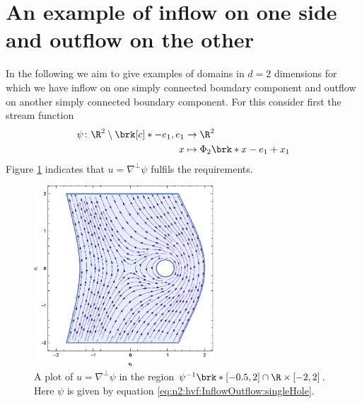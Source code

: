 \section{An example of inflow on one side and outflow on the other}
In the following we aim to give examples of domains in $d=2$ dimensions for which 
we have inflow on one simply connected boundary component and outflow on another simply connected boundary
component.
For this consider first the stream function
\begin{equation}
  \begin{aligned}
  \psi\colon \R^2\setminus\brk[c]*{-e_1,e_1}&\to\R^2 \\
  x&\mapsto\Phi_2\brk*{x-e_1}+x_1
  \end{aligned}\label{eq:n2:hvf:InflowOutflow:singleHole}
\end{equation}
Figure \ref{pl:n2_hvf_InflowOutflow_asymmetric_single} indicates that $u=\nabla^\perp\psi$ fulfils the
requirements.
\begin{figure}
  \centering
  \includegraphics[width=0.6\textwidth]{../Plots/HarmonicVectorFields_gr3.eps}
  \caption{A plot of $u=\nabla^\perp\psi$ in the region $\psi^{-1}\brk*{[-0.5,2]}\cap \R\times[-2,2]$.
  Here $\psi$ is given by equation \eqref{eq:n2:hvf:InflowOutflow:singleHole}.}
  \label{pl:n2_hvf_InflowOutflow_asymmetric_single}
\end{figure}

